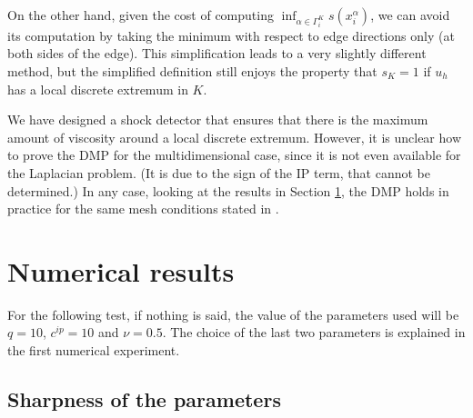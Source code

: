 On the other hand, given the cost of computing $\inf_{\alpha\in\Gamma_i^K} s(x_i^\alpha)$, we can avoid its computation by taking the minimum with respect to edge directions only (at both sides of the edge). This simplification leads to a very slightly different method, but the simplified definition still enjoys the property that $s_K=1$ if $u_h$ has a local discrete extremum in $K$. 

\begin{remark} {
We have designed a shock detector that ensures that there is the maximum amount of viscosity around a local discrete extremum. However, it is unclear how to prove the DMP for the multidimensional case, since it is not even available for the Laplacian problem. (It is due to the sign of the IP term, that cannot be determined.) In any case, looking at the results in Section \ref{s-numex}, the DMP holds in practice for the same mesh conditions stated in \cite{ourpaper}.
}
\end{remark}




\section{Numerical results}\label{s-numex}
\label{sec-numres}
For the following test, if nothing is said, the value of the parameters used will be { $q=10$}, $c^{ip} = 10$ and $\nu=0.5$. The choice of the last two parameters is explained in the first numerical experiment.

\subsection{Sharpness of the parameters}

